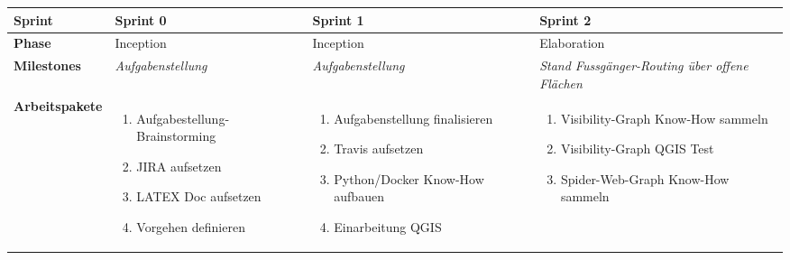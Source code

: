 \begin{landscape}
\begin{longtable}{l p{5.5cm} p{5.5cm} p{5.5cm}} 
        \toprule
        \textbf{Sprint}
                                & \textbf{Sprint 0}
                                & \textbf{Sprint 1}
                                & \textbf{Sprint 2} \\
        
        \midrule
        \textbf{Phase}
                                & Inception
                                & Inception
                                & Elaboration \\
        
        \textbf{Milestones} 	
                                & \textit{Aufgabenstellung}
                                & \textit{Aufgabenstellung}
                                & \textit{Stand Fussgänger-Routing über offene Flächen}  \\
        
        \textbf{Arbeitspakete}
                                & \begin{enumerate}[noitemsep]
                                    \item Aufgabestellung-Brainstorming
                                    \item JIRA aufsetzen
                                    \item LATEX Doc aufsetzen
                                    \item Vorgehen definieren
                                \end{enumerate}
                                & \begin{enumerate}[noitemsep]
                                    \item Aufgabenstellung finalisieren
                                    \item Travis aufsetzen
                                    \item Python/Docker Know-How aufbauen
                                    \item Einarbeitung QGIS
                                \end{enumerate}
                                & \begin{enumerate}[noitemsep]
                                    \item Visibility-Graph Know-How sammeln
                                    \item Visibility-Graph QGIS Test
                                    \item Spider-Web-Graph Know-How sammeln
                                \end{enumerate}  \\
        

\end{longtable}
\end{landscape}
